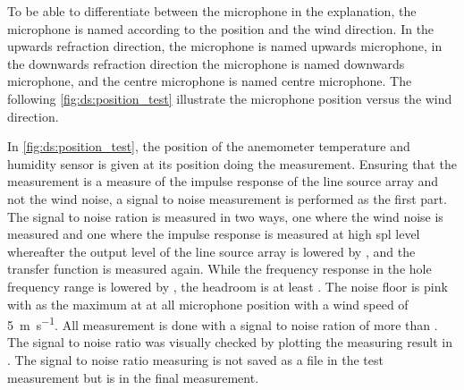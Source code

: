 To be able to differentiate between the microphone in the explanation, the microphone is named according to the position and the wind direction. In the upwards refraction direction, the microphone is named upwards microphone, in the downwards refraction direction the microphone is named downwards microphone, and the centre microphone is named centre microphone. The following \autoref{fig:ds:position_test} illustrate the microphone position versus the wind direction.


In \autoref{fig:ds:position_test}, the position of the anemometer temperature and humidity sensor is given at its position doing the measurement. Ensuring that the measurement is a measure of the impulse response of the line source array and not the wind noise, a signal to noise measurement is performed as the first part. The signal to noise ration is measured in two ways, one where the wind noise is measured and one where the impulse response is measured at high \gls{spl} level whereafter the output level of the line source array is lowered by , and the transfer function is measured again. While the frequency response in the hole frequency range is lowered by , the headroom is at least  . The noise floor is pink with  as the maximum at  at all microphone position with a wind speed of \SI{5}{\meter\per\second}. All measurement is done with a signal to noise ration of more than . The signal to noise ratio was visually checked by plotting the measuring result in \matlab. The signal to noise ratio measuring is not saved as a file in the test measurement but is in the final measurement.



